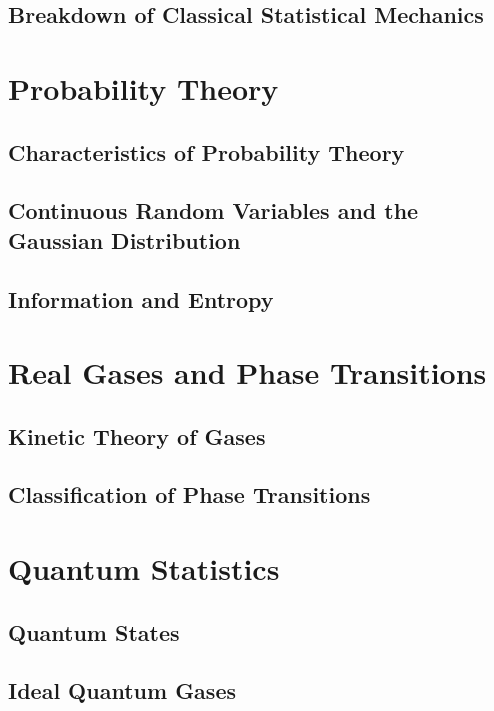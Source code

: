 \documentclass[12pt, a4paper, oneside, openright, titlepage]{book}
\begin{document}
\chapter{Breakdown of Classical Statistical Mechanics}



\part{Probability Theory}


\chapter{Characteristics of Probability Theory}


\chapter{Continuous Random Variables and the Gaussian Distribution}


\chapter{Information and Entropy}





\part{Real Gases and Phase Transitions}


\chapter{Kinetic Theory of Gases}



\chapter{Classification of Phase Transitions}






\part{Quantum Statistics}


\chapter{Quantum States}


\chapter{Ideal Quantum Gases}








\begin{appendices}


\end{appendices}
\end{document}
